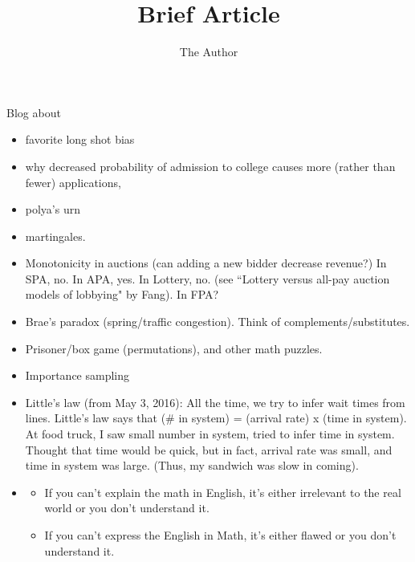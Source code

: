 \documentclass[11pt, oneside]{article}   	%
\title{Brief Article}
\author{The Author}
\begin{document}
\maketitle

Blog about 
\begin{itemize}
\item favorite long shot bias
\item why decreased probability of admission to college causes more (rather than fewer) applications, 
\item polya's urn
\item martingales. 
\item Monotonicity in auctions (can adding a new bidder decrease revenue?) In SPA, no. In APA, yes. In Lottery, no. (see ``Lottery versus all-pay auction models of lobbying" by Fang). In FPA?
\item Brae's paradox (spring/traffic congestion). Think of complements/substitutes.
\item Prisoner/box game (permutations), and other math puzzles.
\item Importance sampling
\item Little's law (from May 3, 2016): All the time, we try to infer wait times from lines. Little's law says that (\# in system) = (arrival rate) x (time in system). At food truck, I saw small number in system, tried to infer time in system. Thought that time would be quick, but in fact, arrival rate was small, and time in system was large. (Thus, my sandwich was slow in coming). 
\item
\begin{itemize}
\item If you can't explain the math in English, it's either irrelevant to the real world or you don't understand it. 
\item If you can't express the English in Math, it's either flawed or you don't understand it.
\end{itemize}
\end{itemize}
\end{document}

